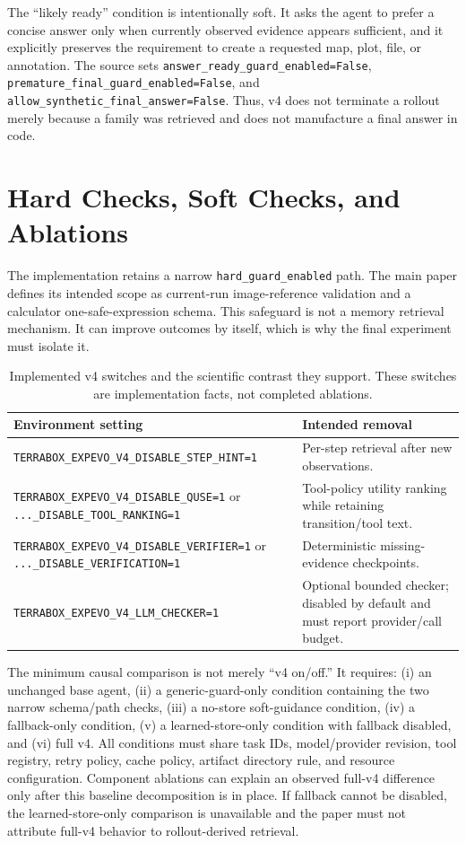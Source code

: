 \documentclass[10pt]{article}
\begin{document}
The ``likely ready'' condition is intentionally soft. It asks the agent to prefer a concise answer only when currently observed evidence appears sufficient, and it explicitly preserves the requirement to create a requested map, plot, file, or annotation. The source sets \texttt{answer\_ready\_guard\_enabled=False}, \texttt{premature\_final\_guard\_enabled=False}, and \texttt{allow\_synthetic\_final\_answer=False}. Thus, v4 does not terminate a rollout merely because a family was retrieved and does not manufacture a final answer in code.

\section{Hard Checks, Soft Checks, and Ablations}
The implementation retains a narrow \texttt{hard\_guard\_enabled} path. The main paper defines its intended scope as current-run image-reference validation and a calculator one-safe-expression schema. This safeguard is not a memory retrieval mechanism. It can improve outcomes by itself, which is why the final experiment must isolate it.

\begin{table}[t]
\centering
\caption{Implemented v4 switches and the scientific contrast they support. These switches are implementation facts, not completed ablations.}
\small
\begin{tabular}{p{4.2cm}p{6.8cm}}
\toprule
Environment setting & Intended removal \\
\midrule
\texttt{TERRABOX\_EXPEVO\_V4\_DISABLE\_STEP\_HINT=1} & Per-step retrieval after new observations. \\
\texttt{TERRABOX\_EXPEVO\_V4\_DISABLE\_QUSE=1} or \texttt{...\_DISABLE\_TOOL\_RANKING=1} & Tool-policy utility ranking while retaining transition/tool text. \\
\texttt{TERRABOX\_EXPEVO\_V4\_DISABLE\_VERIFIER=1} or \texttt{...\_DISABLE\_VERIFICATION=1} & Deterministic missing-evidence checkpoints. \\
\texttt{TERRABOX\_EXPEVO\_V4\_LLM\_CHECKER=1} & Optional bounded checker; disabled by default and must report provider/call budget. \\
\bottomrule
\end{tabular}
\end{table}

The minimum causal comparison is not merely ``v4 on/off.'' It requires: (i) an unchanged base agent, (ii) a generic-guard-only condition containing the two narrow schema/path checks, (iii) a no-store soft-guidance condition, (iv) a fallback-only condition, (v) a learned-store-only condition with fallback disabled, and (vi) full v4. All conditions must share task IDs, model/provider revision, tool registry, retry policy, cache policy, artifact directory rule, and resource configuration. Component ablations can explain an observed full-v4 difference only after this baseline decomposition is in place. If fallback cannot be disabled, the learned-store-only comparison is unavailable and the paper must not attribute full-v4 behavior to rollout-derived retrieval.
\end{document}
